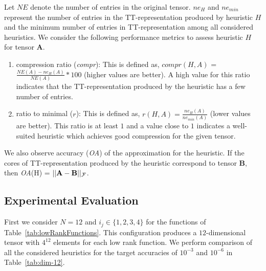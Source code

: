 \documentclass[runningheads]{llncs}
\newcommand{\tensor}[1]{\cal\textbf{#1}\xspace}
\begin{document}
Let $NE$ denote the number of entries in the original tensor. $ne_H$ and $ne_{min}$ represent the number of entries in the TT-representation produced by heuristic $H$ and the minimum number of entries in TT-representation among all considered heuristics. We consider the following performance metrics to assess heuristic $H$ for tensor \tensor{A}.
\begin{enumerate}
	\item compression ratio (\textit{compr}): This is defined as, $compr(H,A)$ = $\frac{NE(A)- ne_H(A)}{NE(A)}*100$ (higher values are better). A high value for this ratio indicates that the TT-representation produced by the heuristic has a few number of entries.
	\item ratio to minimal ($r$): This is defined as, $r(H, A) = \frac{ne_H(A)}{ne_{min}(A)}$ (lower values are better). This ratio is at least $1$ and a value close to $1$ indicates a well-suited heuristic which achieves good compression for the given tensor. 
\end{enumerate}

\noindent We also observe accuracy (\textit{OA}) of the approximation for the heuristic. If the cores of TT-representation produced by the heuristic correspond to tensor \tensor{B}, then \textit{OA}(H) = $||\tensor{A}-\tensor{B}||_F$.


\subsection{Experimental Evaluation}


First we consider $N=12$ and $i_j \in \{1, 2, 3, 4\}$ for the functions of Table~\ref{tab:lowRankFunctions}. This configuration produces a $12$-dimensional tensor with $4^{12}$ elements for each low rank function. We perform comparison of all the considered heuristics for the target accuracies of $10^{-3}$ and $10^{-6}$ in Table~\ref{tab:dim-12}.  
\end{document}
